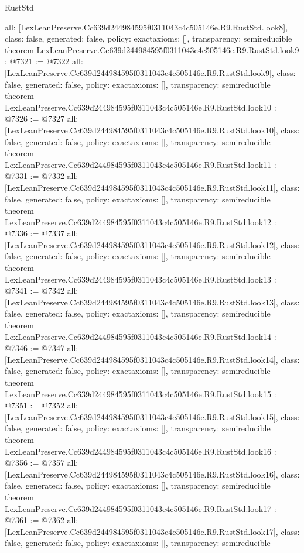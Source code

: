 \begin{lexlean}{RustStd}
\begin{coremodule}
{  all: [LexLeanPreserve.Cc639d244984595f0311043c4c505146e.R9.RustStd.look8],
  class: false,
  generated: false,
  policy: exact{axioms: []},
  transparency: semireducible
}
theorem LexLeanPreserve.Cc639d244984595f0311043c4c505146e.R9.RustStd.look9 : @7321 := @7322 {
  all: [LexLeanPreserve.Cc639d244984595f0311043c4c505146e.R9.RustStd.look9],
  class: false,
  generated: false,
  policy: exact{axioms: []},
  transparency: semireducible
}
theorem LexLeanPreserve.Cc639d244984595f0311043c4c505146e.R9.RustStd.look10 : @7326 := @7327 {
  all: [LexLeanPreserve.Cc639d244984595f0311043c4c505146e.R9.RustStd.look10],
  class: false,
  generated: false,
  policy: exact{axioms: []},
  transparency: semireducible
}
theorem LexLeanPreserve.Cc639d244984595f0311043c4c505146e.R9.RustStd.look11 : @7331 := @7332 {
  all: [LexLeanPreserve.Cc639d244984595f0311043c4c505146e.R9.RustStd.look11],
  class: false,
  generated: false,
  policy: exact{axioms: []},
  transparency: semireducible
}
theorem LexLeanPreserve.Cc639d244984595f0311043c4c505146e.R9.RustStd.look12 : @7336 := @7337 {
  all: [LexLeanPreserve.Cc639d244984595f0311043c4c505146e.R9.RustStd.look12],
  class: false,
  generated: false,
  policy: exact{axioms: []},
  transparency: semireducible
}
theorem LexLeanPreserve.Cc639d244984595f0311043c4c505146e.R9.RustStd.look13 : @7341 := @7342 {
  all: [LexLeanPreserve.Cc639d244984595f0311043c4c505146e.R9.RustStd.look13],
  class: false,
  generated: false,
  policy: exact{axioms: []},
  transparency: semireducible
}
theorem LexLeanPreserve.Cc639d244984595f0311043c4c505146e.R9.RustStd.look14 : @7346 := @7347 {
  all: [LexLeanPreserve.Cc639d244984595f0311043c4c505146e.R9.RustStd.look14],
  class: false,
  generated: false,
  policy: exact{axioms: []},
  transparency: semireducible
}
theorem LexLeanPreserve.Cc639d244984595f0311043c4c505146e.R9.RustStd.look15 : @7351 := @7352 {
  all: [LexLeanPreserve.Cc639d244984595f0311043c4c505146e.R9.RustStd.look15],
  class: false,
  generated: false,
  policy: exact{axioms: []},
  transparency: semireducible
}
theorem LexLeanPreserve.Cc639d244984595f0311043c4c505146e.R9.RustStd.look16 : @7356 := @7357 {
  all: [LexLeanPreserve.Cc639d244984595f0311043c4c505146e.R9.RustStd.look16],
  class: false,
  generated: false,
  policy: exact{axioms: []},
  transparency: semireducible
}
theorem LexLeanPreserve.Cc639d244984595f0311043c4c505146e.R9.RustStd.look17 : @7361 := @7362 {
  all: [LexLeanPreserve.Cc639d244984595f0311043c4c505146e.R9.RustStd.look17],
  class: false,
  generated: false,
  policy: exact{axioms: []},
  transparency: semireducible
}
\end{coremodule}
\end{lexlean}
